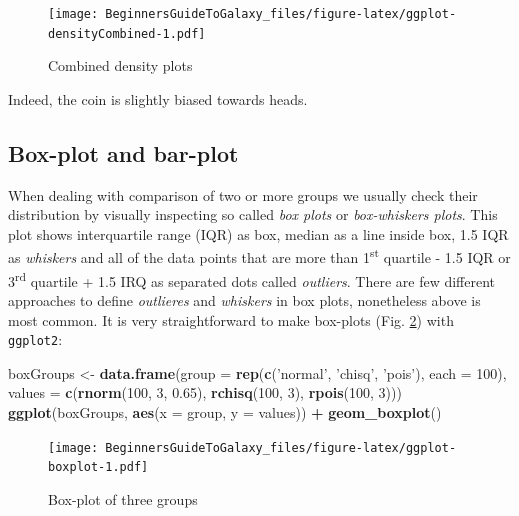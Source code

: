 \documentclass[]{book}
\newenvironment{Shaded}{\begin{snugshade}}{\end{snugshade}}
\newcommand{\KeywordTok}[1]{\textcolor[rgb]{0.13,0.29,0.53}{\textbf{#1}}}
\newcommand{\DataTypeTok}[1]{\textcolor[rgb]{0.13,0.29,0.53}{#1}}
\newcommand{\DecValTok}[1]{\textcolor[rgb]{0.00,0.00,0.81}{#1}}
\newcommand{\FloatTok}[1]{\textcolor[rgb]{0.00,0.00,0.81}{#1}}
\newcommand{\StringTok}[1]{\textcolor[rgb]{0.31,0.60,0.02}{#1}}
\newcommand{\OperatorTok}[1]{\textcolor[rgb]{0.81,0.36,0.00}{\textbf{#1}}}
\newcommand{\NormalTok}[1]{#1}
\theoremstyle{definition}
\theoremstyle{definition}
\theoremstyle{definition}
\theoremstyle{remark}
\begin{document}
\begin{figure}
\centering
\texttt{[image: BeginnersGuideToGalaxy\_files/figure-latex/ggplot-densityCombined-1.pdf]}
\caption{\label{fig:ggplot-densityCombined}Combined density plots}
\end{figure}

Indeed, the coin is slightly biased towards heads.

\subsection{Box-plot and bar-plot}\label{box-plot-and-bar-plot}

When dealing with comparison of two or more groups we usually check
their distribution by visually inspecting so called \emph{box plots} or
\emph{box-whiskers plots}. This plot shows interquartile range (IQR) as
box, median as a line inside box, 1.5 IQR as \emph{whiskers} and all of
the data points that are more than 1\textsuperscript{st} quartile - 1.5
IQR or 3\textsuperscript{rd} quartile + 1.5 IRQ as separated dots called
\emph{outliers}. There are few different approaches to define
\emph{outlieres} and \emph{whiskers} in box plots, nonetheless above is
most common. It is very straightforward to make box-plots (Fig.
\ref{fig:ggplot-boxplot}) with \texttt{ggplot2}:

\begin{Shaded}
\begin{Highlighting}[]
\NormalTok{boxGroups <-}\StringTok{ }\KeywordTok{data.frame}\NormalTok{(}\DataTypeTok{group =} \KeywordTok{rep}\NormalTok{(}\KeywordTok{c}\NormalTok{(}\StringTok{'normal'}\NormalTok{, }\StringTok{'chisq'}\NormalTok{, }\StringTok{'pois'}\NormalTok{), }\DataTypeTok{each =} \DecValTok{100}\NormalTok{),}
                        \DataTypeTok{values =} \KeywordTok{c}\NormalTok{(}\KeywordTok{rnorm}\NormalTok{(}\DecValTok{100}\NormalTok{, }\DecValTok{3}\NormalTok{, }\FloatTok{0.65}\NormalTok{), }\KeywordTok{rchisq}\NormalTok{(}\DecValTok{100}\NormalTok{, }\DecValTok{3}\NormalTok{), }\KeywordTok{rpois}\NormalTok{(}\DecValTok{100}\NormalTok{, }\DecValTok{3}\NormalTok{)))}
\KeywordTok{ggplot}\NormalTok{(boxGroups, }\KeywordTok{aes}\NormalTok{(}\DataTypeTok{x =}\NormalTok{ group, }\DataTypeTok{y =}\NormalTok{ values)) }\OperatorTok{+}
\StringTok{  }\KeywordTok{geom_boxplot}\NormalTok{()}
\end{Highlighting}
\end{Shaded}

\begin{figure}
\centering
\texttt{[image: BeginnersGuideToGalaxy\_files/figure-latex/ggplot-boxplot-1.pdf]}
\caption{\label{fig:ggplot-boxplot}Box-plot of three groups}
\end{figure}
\end{document}

